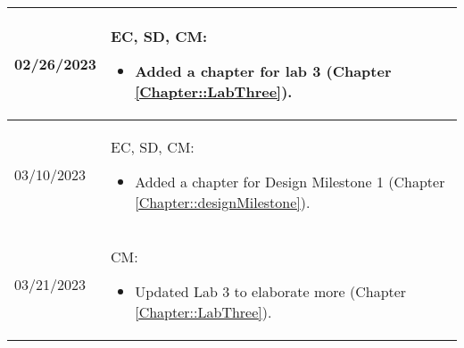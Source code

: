 \begin{longtable}{|l||p{13.5cm}|}
	02/26/2023    & EC, SD, CM:
	\begin{itemize}[topsep=0pt,itemsep=0pt,parsep=0pt,partopsep=0pt,leftmargin=12pt]
		\item Added a chapter for lab 3 (Chapter \ref{Chapter::LabThree}).
	\end{itemize}
	\\ \hline
	03/10/2023    & EC, SD, CM:
	\begin{itemize}[topsep=0pt,itemsep=0pt,parsep=0pt,partopsep=0pt,leftmargin=12pt]
		\item Added a chapter for Design Milestone 1 (Chapter \ref{Chapter::designMilestone}).
	\end{itemize}
	\\ \hline
	03/21/2023    & CM:
	\begin{itemize}[topsep=0pt,itemsep=0pt,parsep=0pt,partopsep=0pt,leftmargin=12pt]
		\item Updated Lab 3 to elaborate more (Chapter \ref{Chapter::LabThree}).
	\end{itemize}
	\\ \hline
\end{longtable}